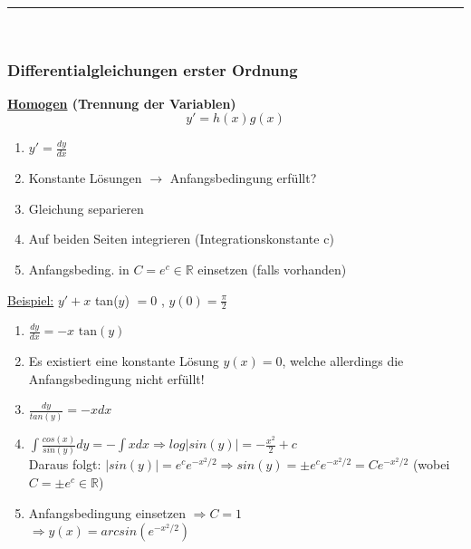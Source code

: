 \documentclass[6pt]{article}
\begin{document}
\begin{multicols*}{3}
	

	\vspace{2mm}
  		\noindent\textcolor{gray}{\rule{9cm}{0.2pt}}
	\vspace{-8mm}\\
	
	\subsubsection*{Differentialgleichungen erster Ordnung}
	
	{\bf \underline{Homogen} (Trennung der Variablen)}\\
						\vspace{-2mm}
						\[ y' = h(x)g(x) \]
						
	\begin{enumerate}[label=(\roman*), itemsep=2pt, parsep=3pt ]
		\item $y' = \frac{dy}{dx}$
		\item Konstante L{\"o}sungen  $\rightarrow$ Anfangsbedingung erf{\"u}llt?
		\item Gleichung separieren
		\item Auf beiden Seiten integrieren (Integrationskonstante c)
		\item Anfangsbeding. in $C = e^c \in \mathbb{R}$  einsetzen (falls vorhanden)
	\end{enumerate}
	
	\underline{Beispiel:} 	\hspace{5mm} 		$y' + x$ tan($y$) $= 0$ , $y(0)=\frac{\pi}{2}$ \\
	\begin{enumerate}[label=(\roman*), itemsep=2pt, parsep=3pt ]
		\item $ \frac{dy}{dx} = -x \text{ tan}(y)$
		\item Es existiert eine konstante L{\"o}sung $y(x) = 0$, welche allerdings die Anfangsbedingung nicht erf{\"u}llt!
		\item $\frac{dy}{tan(y)} = -xdx$
		\item  $\int \frac{cos(x)}{sin(y)}dy = - \int xdx \Rightarrow log |sin(y)| = -\frac{x^2}{2} + c$ \\
				Daraus folgt: $|sin(y)| = e^c e^{-x^2/2} \Rightarrow sin(y) = \pm e^c e^{-x^2/2} = Ce^{-x^2/2}$ (wobei $C = \pm e^c \in \mathbb{R}$)
		\item Anfangsbedingung einsetzen $\Rightarrow C=1$ \\
					$\Rightarrow y(x) = arcsin(e^{-x^2/2})$


\end{enumerate}
\end{multicols*}
\end{document}
